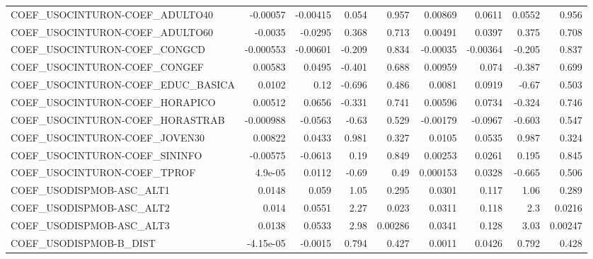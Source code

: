 \begin{tabular}{lrrrrrrrr}
COEF\_USOCINTURON-COEF\_ADULTO40    &    -0.00057 &     -0.00415 &   0.054 &    0.957 &    0.00869 &      0.0611 &       0.0552 &         0.956 \\
COEF\_USOCINTURON-COEF\_ADULTO60    &     -0.0035 &      -0.0295 &   0.368 &    0.713 &    0.00491 &      0.0397 &        0.375 &         0.708 \\
COEF\_USOCINTURON-COEF\_CONGCD      &   -0.000553 &     -0.00601 &  -0.209 &    0.834 &   -0.00035 &    -0.00364 &       -0.205 &         0.837 \\
COEF\_USOCINTURON-COEF\_CONGEF      &     0.00583 &       0.0495 &  -0.401 &    0.688 &    0.00959 &       0.074 &       -0.387 &         0.699 \\
COEF\_USOCINTURON-COEF\_EDUC\_BASICA &      0.0102 &         0.12 &  -0.696 &    0.486 &     0.0081 &      0.0919 &        -0.67 &         0.503 \\
COEF\_USOCINTURON-COEF\_HORAPICO    &     0.00512 &       0.0656 &  -0.331 &    0.741 &    0.00596 &      0.0734 &       -0.324 &         0.746 \\
COEF\_USOCINTURON-COEF\_HORASTRAB   &   -0.000988 &      -0.0563 &   -0.63 &    0.529 &   -0.00179 &     -0.0967 &       -0.603 &         0.547 \\
COEF\_USOCINTURON-COEF\_JOVEN30     &     0.00822 &       0.0433 &   0.981 &    0.327 &     0.0105 &      0.0535 &        0.987 &         0.324 \\
COEF\_USOCINTURON-COEF\_SININFO     &    -0.00575 &      -0.0613 &    0.19 &    0.849 &    0.00253 &      0.0261 &        0.195 &         0.845 \\
COEF\_USOCINTURON-COEF\_TPROF       &     4.9e-05 &       0.0112 &   -0.69 &     0.49 &   0.000153 &      0.0328 &       -0.665 &         0.506 \\
COEF\_USODISPMOB-ASC\_ALT1          &      0.0148 &        0.059 &    1.05 &    0.295 &     0.0301 &       0.117 &         1.06 &         0.289 \\
COEF\_USODISPMOB-ASC\_ALT2          &       0.014 &       0.0551 &    2.27 &    0.023 &     0.0311 &       0.118 &          2.3 &        0.0216 \\
COEF\_USODISPMOB-ASC\_ALT3          &      0.0138 &       0.0533 &    2.98 &  0.00286 &     0.0341 &       0.128 &         3.03 &       0.00247 \\
COEF\_USODISPMOB-B\_DIST            &   -4.15e-05 &      -0.0015 &   0.794 &    0.427 &     0.0011 &      0.0426 &        0.792 &         0.428 \\

\end{tabular}
